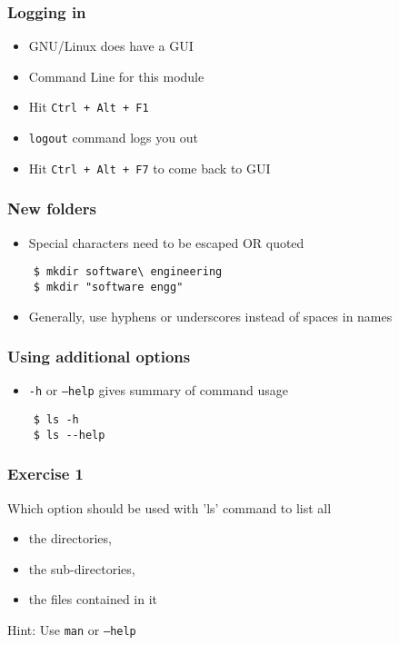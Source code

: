 \documentclass[17pt,compress]{beamer}
\begin{document}
\begin{frame}[fragile]
  \frametitle{Logging in}
  \begin{itemize}
  \item GNU/Linux does have a GUI
  \item Command Line for this module
  \item Hit \texttt{Ctrl + Alt + F1}
  \item \texttt{logout} command logs you out
  \item Hit \texttt{Ctrl + Alt + F7} to come back to GUI
  \end{itemize}
\end{frame}

\begin{frame}[fragile]
  \frametitle{New folders}
  \begin{itemize}
  \item Special characters need to be escaped OR quoted
  \end{itemize}
  \begin{lstlisting}
    $ mkdir software\ engineering
    $ mkdir "software engg"
  \end{lstlisting} 
  \begin{itemize}
  \item Generally, use hyphens or underscores instead of spaces in names
  \end{itemize}
\end{frame}

\begin{frame}[fragile]
  \frametitle{Using additional options}

  \begin{itemize}
  \item \texttt{-h} or \texttt{---help} gives summary of command usage
  \end{itemize}
  \begin{lstlisting}
    $ ls -h
    $ ls --help
  \end{lstlisting} %
\end{frame}

\begin{frame}
  \frametitle{Exercise 1}
  Which option should be used with 'ls' command to list all\\
  \begin{itemize}
  	\item the directories,\\
        \item the sub-directories,\\
	\item the files contained in it
  \end{itemize}
        Hint: Use \texttt{man} or \texttt{---help}
\end{frame}
\end{document}

